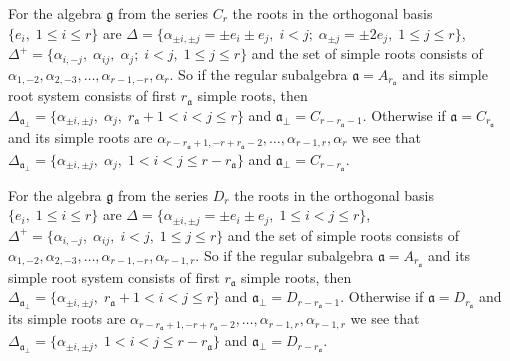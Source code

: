 \documentclass[a4paper,12pt]{article}
\theoremstyle{definition} \newtheorem{Def}{Definition}
\begin{document}
For the algebra $\mathfrak{g}$ from the series $C_r$ the roots in the orthogonal basis $\{e_i,\; 1\leq i\leq r\}$ are $\Delta=\{\alpha_{\pm i,\pm j}=\pm e_i\pm e_j,\;i<j;\; \alpha_{\pm j}=\pm 2e_{ j},\; 1\leq j\leq r\}$, $\Delta^{+}=\{\alpha_{i,-j},\; \alpha_{ij},\; \alpha_j;\; i<j,\; 1\leq j\leq r\}$ and the set of simple roots consists of $\alpha_{1,-2},\alpha_{2,-3},\dots,\alpha_{r-1,-r},\alpha_r$. So if the regular subalgebra $\mathfrak{a}=A_{r_{\mathfrak{a}}}$ and its simple root system consists of first $r_{\mathfrak{a}}$ simple roots, then $\Delta_{\mathfrak{a}_{\bot}}=\{\alpha_{\pm i,\pm j},\;\alpha_j,\; r_{\mathfrak{a}}+1<i<j\leq r\}$ and $\mathfrak{a}_{\bot}=C_{r-r_{\mathfrak{a}}-1}$. Otherwise if $\mathfrak{a}=C_{r_{\mathfrak{a}}}$ and its simple roots are $\alpha_{r-r_{\mathfrak{a}}+1,-r+r_{\mathfrak{a}}-2},\dots,\alpha_{r-1,r},\alpha_r$ we see that $\Delta_{\mathfrak{a}_{\bot}}=\{\alpha_{\pm i,\pm j},\;\alpha_j,\; 1<i<j\leq r-r_{\mathfrak{a}}\}$ and $\mathfrak{a}_{\bot}=C_{r-r_{\mathfrak{a}}}$.

For the algebra $\mathfrak{g}$ from the series $D_r$ the roots in the orthogonal basis $\{e_i,\; 1\leq i\leq r\}$ are $\Delta=\{\alpha_{\pm i,\pm j}=\pm e_i\pm e_j,\;1\leq i<j\leq r\}$, $\Delta^{+}=\{\alpha_{i,-j},\; \alpha_{ij},\; i<j,\; 1\leq j\leq r\}$ and the set of simple roots consists of $\alpha_{1,-2},\alpha_{2,-3},\dots,\alpha_{r-1,-r},\alpha_{r-1,r}$. So if the regular subalgebra $\mathfrak{a}=A_{r_{\mathfrak{a}}}$ and its simple root system consists of first $r_{\mathfrak{a}}$ simple roots, then $\Delta_{\mathfrak{a}_{\bot}}=\{\alpha_{\pm i,\pm j},\; r_{\mathfrak{a}}+1<i<j\leq r\}$ and $\mathfrak{a}_{\bot}=D_{r-r_{\mathfrak{a}}-1}$. Otherwise if $\mathfrak{a}=D_{r_{\mathfrak{a}}}$ and its simple roots are $\alpha_{r-r_{\mathfrak{a}}+1,-r+r_{\mathfrak{a}}-2},\dots,\alpha_{r-1,r},\alpha_{r-1,r}$ we see that $\Delta_{\mathfrak{a}_{\bot}}=\{\alpha_{\pm i,\pm j},\; 1<i<j\leq r-r_{\mathfrak{a}}\}$ and $\mathfrak{a}_{\bot}=D_{r-r_{\mathfrak{a}}}$.
\end{document}

